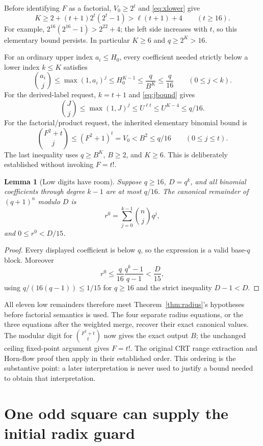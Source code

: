 \documentclass[11pt]{article}
\newtheorem{lemma}[theorem]{Lemma}
\theoremstyle{remark}
\numberwithin{equation}{section}
\begin{document}
Before identifying $F$ as a factorial, $V_0\ge2^t$ and \eqref{eq:xlower} give
\[
K\ge2+(t+1)2^t(2^t-1)>\ell(t+1)+4\qquad(t\ge16).
\]
For example, $2^{16}(2^{16}-1)>2^{22}+4$; the left side increases with $t$, so this elementary bound persists. In particular $K\ge6$ and $q\ge2^K>16$.

For an ordinary upper index $a_i\le H_0$, every coefficient needed strictly below a lower index $k\le K$ satisfies
\[
\binom{a_i}{j}\le\max(1,a_i)^j\le H_0^{K-1}
\le\frac{q}{B^K}\le\frac q{16}\qquad(0\le j<k).
\]
For the derived-label request, $k=t+1$ and \eqref{eq:jbound} gives
\[
\binom Jj\le\max(1,J)^j\le U^{\ell t}
\le U^{K-4}\le q/16.
\]
For the factorial/product request, the inherited elementary binomial bound is
\[
\binom{F^2+t}{j}\le(F^2+1)^t=V_0<B^2\le q/16\qquad(0\le j\le t).
\]
The last inequality uses $q\ge B^K$, $B\ge2$, and $K\ge6$. This is deliberately established without invoking $F=t!$.

\begin{lemma}[Low digits have room]\label{lem:digits}
Suppose $q\ge16$, $D=q^k$, and all binomial coefficients through degree $k-1$ are at most $q/16$. The canonical remainder of $(q+1)^n$ modulo $D$ is
\[
r^0=\sum_{j=0}^{k-1}\binom nj q^j,
\]
and $0\le r^0<D/15$.
\end{lemma}
\begin{proof}
Every displayed coefficient is below $q$, so the expression is a valid base-$q$ block. Moreover
\[
r^0\le\frac q{16}\frac{q^k-1}{q-1}<\frac{D}{15},
\]
using $q/(16(q-1))\le1/15$ for $q\ge16$ and the strict inequality $D-1<D$.
\end{proof}

All eleven low remainders therefore meet Theorem~\ref{thm:radius}'s hypotheses before factorial semantics is used. The four separate radius equations, or the three equations after the weighted merge, recover their exact canonical values. The modular digit for $\binom{F^2+t}{t}$ now gives the exact output $B$; the unchanged ceiling fixed-point argument gives $F=t!$. The original CRT range extraction and Horn-flow proof then apply in their established order. This ordering is the substantive point: a later interpretation is never used to justify a bound needed to obtain that interpretation.

\section{One odd square can supply the initial radix guard}\label{sec:odd-square}
\end{document}
